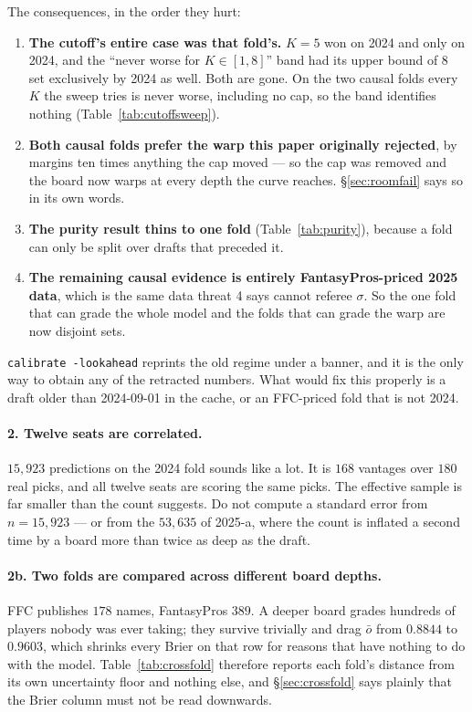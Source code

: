 \documentclass[10pt,a4paper]{article}
\theoremstyle{plain}
\theoremstyle{definition}
\theoremstyle{remark}
\newcommand{\code}[1]{\texttt{\small #1}}
\begin{document}
The consequences, in the order they hurt:

\begin{enumerate}
\item \textbf{The cutoff's entire case was that fold's.} $K = 5$ won on 2024 and only on
2024, and the ``never worse for $K \in [1,8]$'' band had its upper bound of $8$ set
exclusively by 2024 as well. Both are gone. On the two causal folds every $K$ the sweep
tries is never worse, including no cap, so the band identifies nothing
(Table~\ref{tab:cutoffsweep}).
\item \textbf{Both causal folds prefer the warp this paper originally rejected}, by margins
ten times anything the cap moved --- so the cap was removed and the board now warps at every
depth the curve reaches. \S\ref{sec:roomfail} says so in its own words.
\item \textbf{The purity result thins to one fold} (Table~\ref{tab:purity}), because a fold
can only be split over drafts that preceded it.
\item \textbf{The remaining causal evidence is entirely FantasyPros-priced 2025 data},
which is the same data threat 4 says cannot referee $\sigma$. So the one fold that can grade
the whole model and the folds that can grade the warp are now disjoint sets.
\end{enumerate}

\code{calibrate -lookahead} reprints the old regime under a banner, and it is the only way
to obtain any of the retracted numbers. What would fix this properly is a draft older than
2024-09-01 in the cache, or an FFC-priced fold that is not 2024.

\paragraph{2. Twelve seats are correlated.}
$15{,}923$ predictions on the 2024 fold sounds like a lot. It is $168$ vantages over $180$
real picks, and all twelve seats are scoring the same picks. The effective sample is far
smaller than the count suggests. Do not compute a standard error from $n = 15{,}923$ ---
or from the $53{,}635$ of 2025-a, where the count is inflated a second time by a board more
than twice as deep as the draft.

\paragraph{2b. Two folds are compared across different board depths.}
FFC publishes $178$ names, FantasyPros $389$. A deeper board grades hundreds of players
nobody was ever taking; they survive trivially and drag $\bar o$ from $0.8844$ to
$0.9603$, which shrinks every Brier on that row for reasons that have nothing to do with
the model. Table~\ref{tab:crossfold} therefore reports each fold's distance from its own
uncertainty floor and nothing else, and \S\ref{sec:crossfold} says plainly that the Brier
column must not be read downwards.
\end{document}
